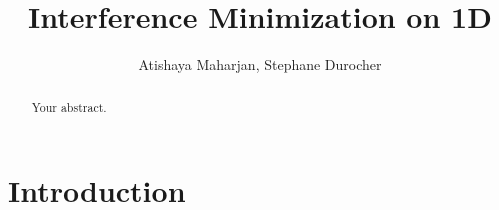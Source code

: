 \documentclass{article}
\title{Interference Minimization on 1D}
\author{Atishaya Maharjan, Stephane Durocher}
\begin{document}
\maketitle

\begin{abstract}
Your abstract.
\end{abstract}

\section{Introduction}





\end{document}
